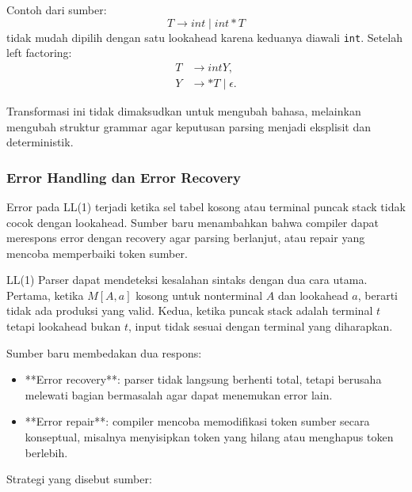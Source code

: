 Contoh dari sumber:
\[
    T\rightarrow int\mid int*T
\]
tidak mudah dipilih dengan satu lookahead karena keduanya diawali \texttt{int}. Setelah left factoring:
\[
\begin{aligned}
    T &\rightarrow intY,\\
    Y &\rightarrow *T\mid\epsilon.
\end{aligned}
\]

Transformasi ini tidak dimaksudkan untuk mengubah bahasa, melainkan mengubah struktur grammar agar keputusan parsing menjadi eksplisit dan deterministik.

\subsubsection{Error Handling dan Error Recovery}

\begin{jawab}
Error pada LL(1) terjadi ketika sel tabel kosong atau terminal puncak stack tidak cocok dengan lookahead. Sumber baru menambahkan bahwa compiler dapat merespons error dengan recovery agar parsing berlanjut, atau repair yang mencoba memperbaiki token sumber.
\end{jawab}

LL(1) Parser dapat mendeteksi kesalahan sintaks dengan dua cara utama. Pertama, ketika $M[A,a]$ kosong untuk nonterminal $A$ dan lookahead $a$, berarti tidak ada produksi yang valid. Kedua, ketika puncak stack adalah terminal $t$ tetapi lookahead bukan $t$, input tidak sesuai dengan terminal yang diharapkan.

Sumber baru membedakan dua respons:
\begin{itemize}
    \item **Error recovery**: parser tidak langsung berhenti total, tetapi berusaha melewati bagian bermasalah agar dapat menemukan error lain.
    \item **Error repair**: compiler mencoba memodifikasi token sumber secara konseptual, misalnya menyisipkan token yang hilang atau menghapus token berlebih.
\end{itemize}

Strategi yang disebut sumber:

